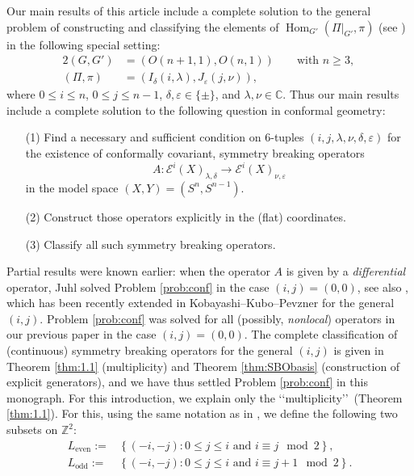 Our main results of this article include 
 a complete solution
 to the general problem
 of constructing and classifying the elements
 of ${\operatorname{Hom}}_{G'}(\Pi|_{G'}, \pi)$
 (see \cite[Prob.~7.3 (3) and (4)]{xkvogan})
 in the following special setting:
\begin{alignat*}{2}
(G,G')&=(O(n+1,1),O(n,1)) \qquad\text{with $n \ge 3$, }
\\
(\Pi,\pi)&=(I_{\delta}(i,\lambda),J_{\varepsilon}(j,\nu)), 
\end{alignat*}
where $0 \le i \le n$, $0 \le j \le n-1$, 
 $\delta, \varepsilon \in \{\pm\}$, 
 and $\lambda, \nu \in {\mathbb{C}}$.  
Thus our main results include a complete solution 
 to the following question in conformal geometry:
\begin{problem}
\label{prob:conf}
\begin{enumerate}
\item[{\rm{(1)}}]
Find a necessary and sufficient condition on 6-tuples
 $(i,j,\lambda,\nu,\delta,\varepsilon)$ for the existence
 of conformally covariant, 
 symmetry breaking operators
\[
  A \colon {\mathcal{E}}^i(X)_{\lambda,\delta} 
           \to {\mathcal{E}}^i(X)_{\nu,\varepsilon}
\]
in the model space $(X,Y)=(S^n, S^{n-1})$.  
\item[{\rm{(2)}}]
Construct those operators explicitly
 in the (flat) coordinates.  
\item[{\rm{(3)}}]
Classify all such symmetry breaking operators.  
\end{enumerate}
\end{problem}
Partial results were known earlier:
when the operator $A$ is given by a {\it{differential}} operator,
 Juhl \cite{Juhl} solved Problem \ref{prob:conf}
 in the case $(i,j)=(0,0)$,
 see also \cite{KOSS}, 
 which has been recently extended
 in Kobayashi--Kubo--Pevzner \cite{KKP}
 for the general $(i,j)$.  
Problem \ref{prob:conf} was solved for all 
 (possibly, {\it{nonlocal}}) operators
 in our previous paper \cite{sbon}
 in the case $(i,j)=(0,0)$.  
The complete classification of (continuous) symmetry breaking operators 
 for the general $(i,j)$ is given in Theorem \ref{thm:1.1} (multiplicity)
 and Theorem \ref{thm:SBObasis} (construction of explicit generators),  
 and we have thus settled Problem \ref{prob:conf}
 in this monograph.  
For this introduction,
 we explain only the
 \lq\lq{multiplicity}\rq\rq\
 (Theorem \ref{thm:1.1}).  
For this,
 using the same notation
 as in \cite[Chap.~1]{sbon}, 
 we define the following two subsets on ${\mathbb{Z}}^2$:
\begin{align*}
L_{\operatorname{even}}:=&\left \{ (-i,-j):
0 \le j\leq i \mbox{ and } i\equiv j \mod 2 \right \},
\\
L_{\operatorname{odd}}:=&\left \{ (-i,-j)
: 0 \le j\leq i \mbox{ and } i \equiv j +1 \mod 2 \right \}.
\end{align*}

